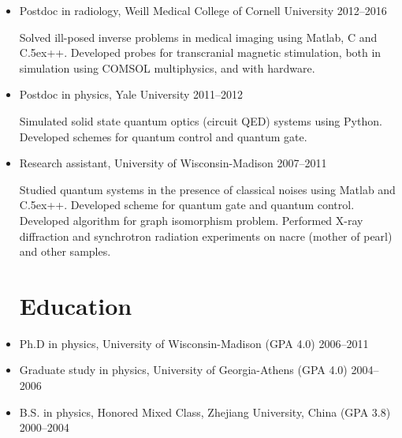 \documentclass[centered,11pt,overlapped]{res}
\def\Cplusplus{{\rm C\raise.5ex\hbox{\small ++}}}
\begin{document}
\begin{resume}
{\begin{itemize}
Implement analysis toolkit for molecular dynamics trajectories using Python. 
Maintain scientific computing services using AWS, Go, Python, PostgreSQL, and Polymer.js.

\item Postdoc in radiology, Weill Medical College of Cornell University \hfill 2012--2016 

Solved ill-posed inverse problems in medical imaging using Matlab, C and \Cplusplus.
Developed probes for transcranial magnetic stimulation, both in simulation using COMSOL multiphysics, and with hardware.

\item Postdoc in physics, Yale University \hfill 2011--2012

Simulated solid state quantum optics (circuit QED) systems using Python. 
Developed schemes for quantum control and quantum gate.
\item {Research assistant, University of Wisconsin-Madison} \hfill {2007--2011} 

Studied quantum systems in the presence of classical noises using Matlab and \Cplusplus.
Developed scheme for quantum gate and quantum control. 
Developed algorithm for graph isomorphism problem.
Performed X-ray diffraction and synchrotron radiation experiments on nacre (mother of pearl) and other samples.

\section{\sc Education}
\item {Ph.D in physics, University of Wisconsin-Madison (GPA 4.0)} \hfill {2006--2011} 
\item {Graduate study in physics, University of Georgia-Athens (GPA 4.0)} \hfill {2004--2006}  
\item {B.S. in physics, Honored Mixed Class},  
{Zhejiang University, China (GPA 3.8)} \hfill {2000--2004}  
\end{itemize}



}
\end{resume}
\end{document}
